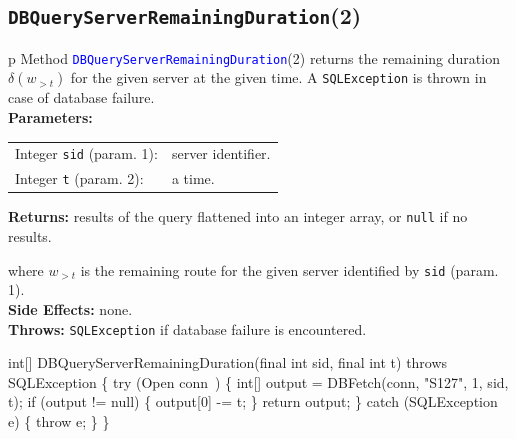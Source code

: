 \subsection{\texttt{DBQueryServerRemainingDuration}(2)}
\begin{tabular}{p{\textwidth}}
\toprule
{}
Method \textcolor{blue}{{\tt{}\protect{}DBQueryServerRemainingDuration}}(2) returns the
remaining duration $\delta(w_{>t})$ for the given server at the given time.
A {\tt{}SQLException} is thrown in case of database failure.\\
\midrule
\textbf{Parameters:} \\
\begin{tabular}{lp{116mm}}
Integer {\tt{}sid} (param. 1):&server identifier.\\
Integer {\tt{}t} (param. 2):&a time.\\
\end{tabular}
\textbf{Returns:} results of the query flattened into an integer array,
or {\tt{}null} if no results.


where $w_{>t}$ is the remaining route for the given server identified by {\tt{}sid} (param. 1).\\
\textbf{Side Effects:} none.\\
\textbf{Throws:} {\tt{}SQLException} if database failure is encountered.\\
\bottomrule
\end{tabular}
\nwenddocs{}\endmoddef{}
int[] DBQueryServerRemainingDuration(final int sid, final int t)
throws SQLException \{
  try (\LA{}Open \code{}conn\edoc{}~{\nwtagstyle{}}\RA{}) \{
    int[] output = DBFetch(conn, "S127", 1, sid, t);
    if (output != null) \{
      output[0] -= t;
    \}
    return output;
  \} catch (SQLException e) \{
    throw e;
  \}
\}
\eatline
